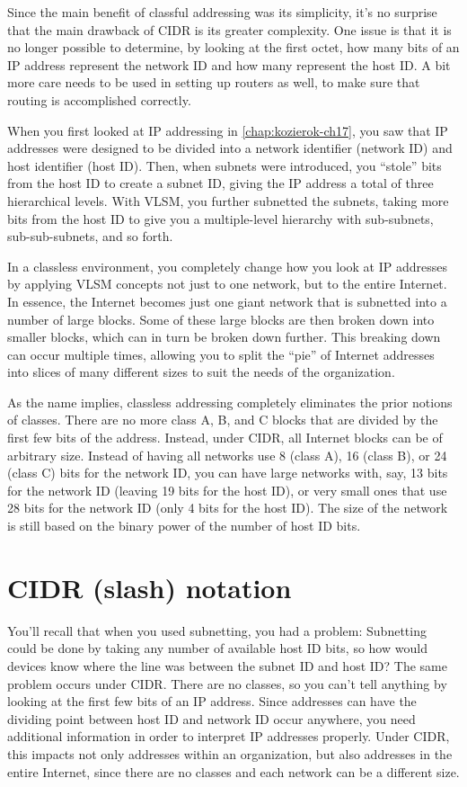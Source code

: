 Since the main benefit of classful addressing was its simplicity, it's
no surprise that the main drawback of CIDR is its greater complexity.
One issue is that it is no longer possible to determine, by looking at
the first octet, how many bits of an IP address represent the network ID
and how many represent the host ID. A bit more care needs to be used in
setting up routers as well, to make sure that routing is accomplished
correctly.



When you first looked at IP addressing in
\cref{chap:kozierok-ch17}, you saw that IP addresses
were designed to be divided into a network identifier (network ID) and
host identifier (host ID). Then, when subnets were introduced, you
``stole'' bits from the host ID to create a subnet ID, giving the IP
address a total of three
hierarchical
levels. With VLSM, you further subnetted the subnets, taking more bits
from the host ID to give you a multiple-level hierarchy with
sub-subnets, sub-sub-subnets, and so forth.

In a classless environment, you completely change how you look at IP
addresses by applying VLSM concepts not just to one network, but to the
entire Internet. In essence, the Internet becomes just one giant network
that is subnetted into a number of large blocks. Some of these large
blocks are then broken down into smaller blocks, which can in turn be
broken down further. This breaking down can occur multiple times,
allowing you to split the ``pie'' of Internet addresses into slices of
many different sizes to suit the needs of the organization.

As the name implies, classless addressing completely eliminates the
prior notions of classes. There are no more class A, B, and C blocks
that are divided by the first few bits of the address. Instead, under
CIDR, all
Internet blocks can be of arbitrary size. Instead of having all networks
use 8 (class A), 16 (class B), or 24 (class C) bits for the network ID,
you can have large networks with, say, 13 bits for the network ID
(leaving 19 bits for the host ID), or very small ones that use 28 bits
for the network ID (only 4 bits for the host ID). The size of the
network is still based on the binary power of the number of host ID
bits.

\section{CIDR (slash) notation}

You'll
recall that when you used subnetting, you had a problem: Subnetting
could be done by taking any number of available host ID bits, so how
would devices know where the line was between the subnet ID and host ID?
The same problem occurs under CIDR. There are no classes, so you can't
tell anything by looking at the first few bits of an IP address. Since
addresses can have the dividing point between host ID and network ID
occur anywhere, you need additional information in order to interpret IP
addresses properly. Under CIDR, this impacts not only addresses within
an organization, but also addresses in the entire Internet, since there
are no classes and each network can be a different size.


